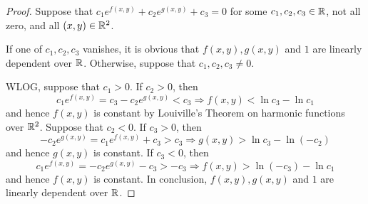 \documentclass[11pt]{amsart}
\theoremstyle{remark}
\theoremstyle{definition}
\numberwithin{equation}{section}
\begin{document}
\begin{proof}
    Suppose that $c_1 e^{f(x,y)} + c_2 e^{g(x,y)} + c_3 = 0$ for some $c_1,c_2,c_3\in {\mathbb R}$, not all zero, and all $(x,y)\in {\mathbb R}^2$.

    If one of $c_1,c_2,c_3$ vanishes, it is obvious that $f(x,y),g(x,y)$ and $1$ are linearly dependent over ${\mathbb R}$. Otherwise, suppose that $c_1,c_2,c_3\ne 0$.

    WLOG, suppose that $c_1 > 0$. If $c_2 > 0$, then
    \[
        c_1 e^{f(x,y)} = c_3 - c_2 e^{g(x,y)} < c_3\Rightarrow f(x,y) < \ln c_3 - \ln c_1
    \]
    and hence $f(x,y)$ is constant by Louiville's Theorem on harmonic functions over ${\mathbb R}^2$. Suppose that $c_2 < 0$. If $c_3 > 0$, then
    \[
        -c_2 e^{g(x,y)} = c_1 e^{f(x,y)} + c_3 > c_3\Rightarrow g(x,y) > \ln c_3 - \ln(-c_2)
    \]
    and hence $g(x,y)$ is constant. If $c_3 < 0$, then
    \[
        c_1 e^{f(x,y)} = -c_2 e^{g(x,y)} - c_3 > -c_3\Rightarrow f(x,y) > \ln(-c_3) - \ln c_1
    \]
    and hence $f(x,y)$ is constant. In conclusion, $f(x,y), g(x,y)$ and $1$ are linearly dependent over ${\mathbb R}$.
\end{proof}
\end{document}
